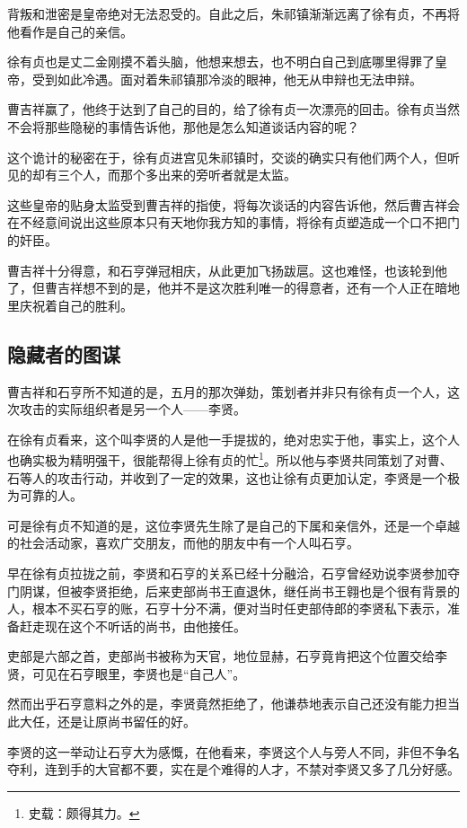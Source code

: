 \begin{multicols}{\theparacolNo}
		背叛和泄密是皇帝绝对无法忍受的。自此之后，朱祁镇渐渐远离了徐有贞，不再将他看作是自己的亲信。

		徐有贞也是丈二金刚摸不着头脑，他想来想去，也不明白自己到底哪里得罪了皇帝，受到如此冷遇。面对着朱祁镇那冷淡的眼神，他无从申辩也无法申辩。

		曹吉祥赢了，他终于达到了自己的目的，给了徐有贞一次漂亮的回击。徐有贞当然不会将那些隐秘的事情告诉他，那他是怎么知道谈话内容的呢？

		这个诡计的秘密在于，徐有贞进宫见朱祁镇时，交谈的确实只有他们两个人，但听见的却有三个人，而那个多出来的旁听者就是太监。

		这些皇帝的贴身太监受到曹吉祥的指使，将每次谈话的内容告诉他，然后曹吉祥会在不经意间说出这些原本只有天地你我方知的事情，将徐有贞塑造成一个口不把门的奸臣。

		曹吉祥十分得意，和石亨弹冠相庆，从此更加飞扬跋扈。这也难怪，也该轮到他了，但曹吉祥想不到的是，他并不是这次胜利唯一的得意者，还有一个人正在暗地里庆祝着自己的胜利。

		\subsection{隐藏者的图谋}
		曹吉祥和石亨所不知道的是，五月的那次弹劾，策划者并非只有徐有贞一个人，这次攻击的实际组织者是另一个人——李贤。

		在徐有贞看来，这个叫李贤的人是他一手提拔的，绝对忠实于他，事实上，这个人也确实极为精明强干，很能帮得上徐有贞的忙\footnote{史载：颇得其力。}。所以他与李贤共同策划了对曹、石等人的攻击行动，并收到了一定的效果，这也让徐有贞更加认定，李贤是一个极为可靠的人。

		可是徐有贞不知道的是，这位李贤先生除了是自己的下属和亲信外，还是一个卓越的社会活动家，喜欢广交朋友，而他的朋友中有一个人叫石亨。

		早在徐有贞拉拢之前，李贤和石亨的关系已经十分融洽，石亨曾经劝说李贤参加夺门阴谋，但被李贤拒绝，后来吏部尚书王直退休，继任尚书王翱也是个很有背景的人，根本不买石亨的账，石亨十分不满，便对当时任吏部侍郎的李贤私下表示，准备赶走现在这个不听话的尚书，由他接任。

		吏部是六部之首，吏部尚书被称为天官，地位显赫，石亨竟肯把这个位置交给李贤，可见在石亨眼里，李贤也是“自己人”。

		然而出乎石亨意料之外的是，李贤竟然拒绝了，他谦恭地表示自己还没有能力担当此大任，还是让原尚书留任的好。

		李贤的这一举动让石亨大为感慨，在他看来，李贤这个人与旁人不同，非但不争名夺利，连到手的大官都不要，实在是个难得的人才，不禁对李贤又多了几分好感。


\end{multicols}
